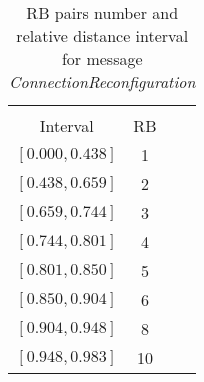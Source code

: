 \begin{table}
	\centering
	\caption{RB pairs number and relative distance interval for message \emph{ConnectionReconfiguration}}
	\label{tab:RB_Distance_Interval}
	\begin{tabular}{cccc}
		\toprule
		\thead{Relative Distance($r/R_{eq}$) \\ Interval }& RB \\
		\midrule
		$\left[0.000, 0.438 \right]$ &         1 \\
		$\left[0.438, 0.659\right]$  &         2 \\
		$\left[0.659, 0.744\right]$ &         3 \\
		$\left[0.744, 0.801 \right]$  &         4 \\
		$\left[0.801, 0.850\right]$  	&         5 \\
		$\left[0.850, 0.904\right]$		&         6 \\
		$\left[0.904, 0.948  \right]$	&         8 \\
		$\left[0.948, 0.983 \right]$  	&         10\\
		\bottomrule
	\end{tabular}
\end{table}

